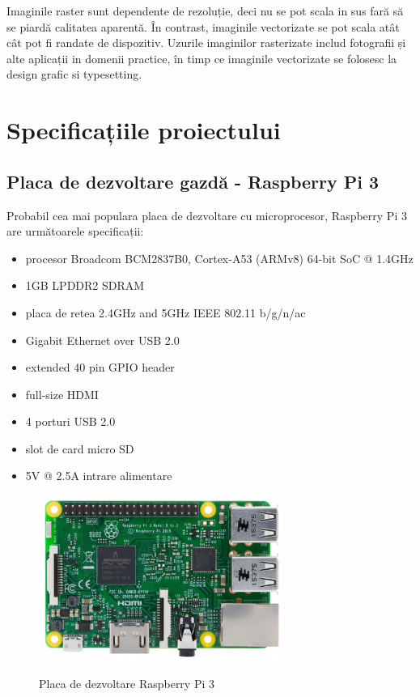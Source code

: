 \documentclass[a4paper, 12pt, twoside]{report}
\begin{document}
Imaginile raster sunt dependente de rezoluție, deci nu se pot scala in sus fară să se piardă calitatea aparentă. În contrast, imaginile vectorizate se pot scala atât cât pot fi randate de dispozitiv. Uzurile imaginilor rasterizate includ fotografii și alte aplicații in domenii practice, în timp ce imaginile vectorizate se folosesc la design grafic si typesetting.

\chapter{Specificațiile proiectului}
	\section{Placa de dezvoltare gazdă - Raspberry Pi 3}
Probabil cea mai populara placa de dezvoltare cu microprocesor, Raspberry Pi 3 are următoarele specificații:
\begin{itemize}
\item procesor Broadcom BCM2837B0, Cortex-A53 (ARMv8) 64-bit SoC @ 1.4GHz
\item 1GB LPDDR2 SDRAM
\item placa de retea 2.4GHz and 5GHz IEEE 802.11 b/g/n/ac
\item Gigabit Ethernet over USB 2.0
\item extended 40 pin GPIO header
\item full-size HDMI
\item 4 porturi USB 2.0
\item slot de card micro SD
\item 5V @ 2.5A intrare alimentare
\end{itemize}

\begin{figure}
		\centering
			{\includegraphics[width=80mm]{rpi.png}}
		\caption{Placa de dezvoltare Raspberry Pi 3}
\end{figure}
\end{document}
